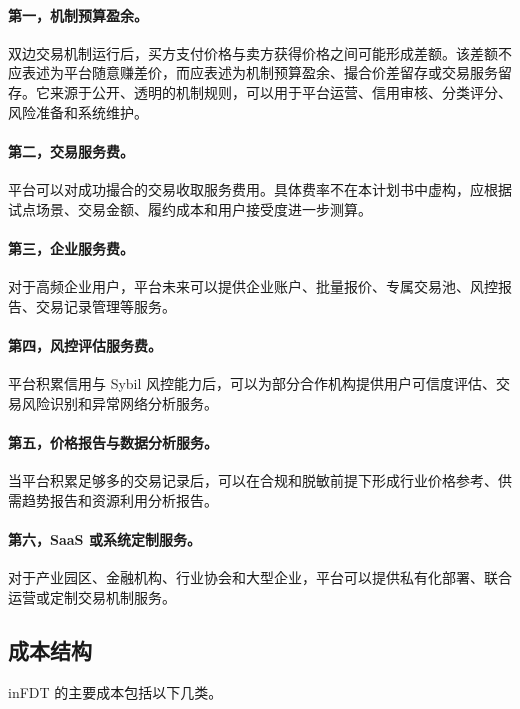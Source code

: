 \documentclass[UTF8,a4paper,12pt]{ctexart}
\begin{document}
\paragraph{第一，机制预算盈余。}
双边交易机制运行后，买方支付价格与卖方获得价格之间可能形成差额。该差额不应表述为平台随意赚差价，而应表述为机制预算盈余、撮合价差留存或交易服务留存。它来源于公开、透明的机制规则，可以用于平台运营、信用审核、分类评分、风险准备和系统维护。

\paragraph{第二，交易服务费。}
平台可以对成功撮合的交易收取服务费用。具体费率不在本计划书中虚构，应根据试点场景、交易金额、履约成本和用户接受度进一步测算。

\paragraph{第三，企业服务费。}
对于高频企业用户，平台未来可以提供企业账户、批量报价、专属交易池、风控报告、交易记录管理等服务。

\paragraph{第四，风控评估服务费。}
平台积累信用与 Sybil 风控能力后，可以为部分合作机构提供用户可信度评估、交易风险识别和异常网络分析服务。

\paragraph{第五，价格报告与数据分析服务。}
当平台积累足够多的交易记录后，可以在合规和脱敏前提下形成行业价格参考、供需趋势报告和资源利用分析报告。

\paragraph{第六，SaaS 或系统定制服务。}
对于产业园区、金融机构、行业协会和大型企业，平台可以提供私有化部署、联合运营或定制交易机制服务。

\subsection{成本结构}

inFDT 的主要成本包括以下几类。
\end{document}
